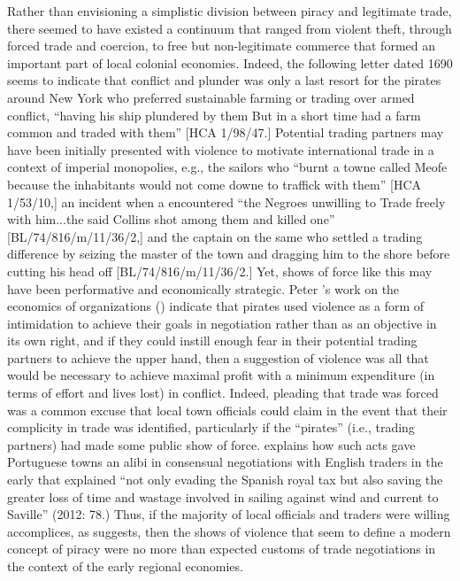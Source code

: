 Rather than envisioning a simplistic division between piracy and legitimate trade, there seemed to have existed a continuum that ranged from violent theft, through forced trade and coercion, to free but non-legitimate commerce that formed an important part of local colonial economies. Indeed, the following letter dated 1690 seems to indicate that conflict and plunder was only a last resort for the pirates around New York who preferred sustainable farming or trading over armed conflict, “having his ship plundered by them But in a short time had a farm common and traded with them” [HCA 1/98/47.] Potential trading partners may have been initially presented with violence to motivate international trade in a context of imperial monopolies, e.g., the sailors who “burnt a towne called Meofe because the inhabitants would not come downe to traffick with them” [HCA 1/53/10,] an incident when a  encountered “the Negroes unwilling to Trade freely with him...the said Collins shot among them and killed one” [BL/74/816/m/11/36/2,] and the captain on the same  who settled a trading difference by seizing the master of the town and dragging him to the shore before cutting his head off [BL/74/816/m/11/36/2.] Yet, shows of force like this may have been performative and economically strategic. Peter \citeauthor{Leeson2007}’s work on the economics of  organizations (\citeyear{Leeson2007,Leeson2008}) indicate that pirates used violence as a form of intimidation to achieve their goals in negotiation rather than as an objective in its own right, and if they could instill enough fear in their potential trading partners to achieve the upper hand, then a suggestion of violence was all that would be necessary to achieve maximal profit with a minimum expenditure (in terms of effort and lives lost) in conflict. Indeed, pleading that trade was forced was a common excuse that local town officials could claim in the event that their complicity in  trade was identified, particularly if the “pirates” (i.e., trading partners) had made some public show of force. \citeauthor{Bicheno2012} explains how such acts gave Portuguese towns an alibi in consensual negotiations with English traders in the early  that explained “not only evading the Spanish royal tax but also saving the greater loss of time and wastage involved in sailing against wind and current to Saville” (2012: 78.) Thus, if the majority of local officials and traders were willing accomplices, as \citeauthor{Bicheno2012} suggests, then the shows of violence that seem to define a modern concept of piracy were no more than expected customs of trade negotiations in the context of the early regional economies. 

